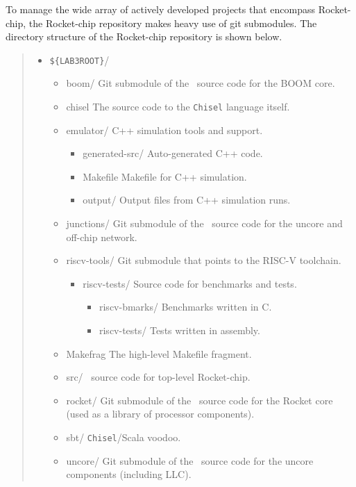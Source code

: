 To manage the wide array of actively developed projects that encompass Rocket-chip, the Rocket-chip repository makes heavy use of git submodules. The directory structure of the Rocket-chip repository is shown below. 

\begin{quote}
\begin{itemize}
\item \verb=${LAB3ROOT}=/\begin{itemize}

  \item boom/ {\footnotesize \color{red} Git submodule of the \Chisel\ source code for the BOOM core.}
  \item chisel {\footnotesize \color{red}  The source code to the {\tt Chisel} language itself.}
  
  \item emulator/ {\footnotesize \color{red} C++ simulation tools and support.}\begin{itemize}
    \item generated-src/{\footnotesize \color{red} Auto-generated C++ code.} 
    \item Makefile {\footnotesize \color{red} Makefile for C++ simulation.}
    \item output/{\footnotesize \color{red} Output files from C++ simulation runs.} 
    \end{itemize}
  \item junctions/ {\footnotesize \color{red} Git submodule of the \Chisel\ source code for the uncore and off-chip network.}
 \item riscv-tools/{\footnotesize \color{red} Git submodule that points to the RISC-V toolchain.}
 \begin{itemize} 
  \item riscv-tests/ {\footnotesize \color{red} Source code for benchmarks and tests.} \begin{itemize}
    \item riscv-bmarks/ {\footnotesize \color{red}  Benchmarks written in C.}
    \item riscv-tests/ {\footnotesize \color{red}  Tests written in assembly.}
  \end{itemize}
  \end{itemize}
   \item Makefrag {\footnotesize \color{red}  The high-level Makefile fragment.}
   
  \item src/ {\footnotesize \color{red} \Chisel\ source code for top-level Rocket-chip.}
  \item rocket/ {\footnotesize \color{red} Git submodule of the \Chisel\ source code for the Rocket core (used as a library of processor components).}
      \item sbt/ {\footnotesize \color{red} {\tt Chisel}/Scala voodoo.}
  \item uncore/ {\footnotesize \color{red} Git submodule of the \Chisel\ source code for the uncore components (including LLC).}
   
\end{itemize}
\end{itemize}
\end{quote}


